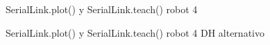 \documentclass[a4paper,12pt]{article}
\begin{document}
\begin{figure}[H]
    \centering
    \begin{adjustbox}{max width=\columnwidth}
    \end{adjustbox}
    \caption{SerialLink.plot() y SerialLink.teach() robot 4}
    \label{teach robot 4}
\end{figure}

\begin{figure}[H]
    \centering
    \begin{adjustbox}{max width=\columnwidth}
    \end{adjustbox}
    \caption{SerialLink.plot() y SerialLink.teach() robot 4 DH alternativo}
    \label{teach robot 4 alt}
\end{figure}
\end{document}
